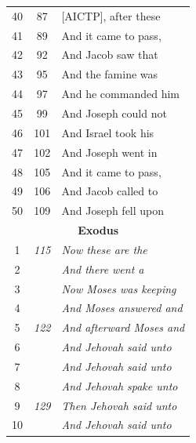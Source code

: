 \documentclass{article}
\newlength{\minipageheight}
\newlength{\minipagewidth}
\begin{document}
\begin{minipage}[l][\minipageheight][t]{\minipagewidth}
\begin{longtable}{ccl}
        40          & 87           & [AICTP], after these             \\
        41          & 89           & And it came to pass,             \\
        42          & 92           & And Jacob saw that               \\
        43          & 95           & And the famine was               \\
        44          & 97           & And he commanded him             \\
        45          & 99           & And Joseph could not             \\
        46          & 101          & And Israel took his              \\
        47          & 102          & And Joseph went in               \\
        48          & 105          & And it came to pass,             \\
        49          & 106          & And Jacob called to              \\
        50          & 109          & And Joseph fell upon             \\

        \multicolumn{3}{c}{\textbf{Exodus}}                           \\
        \hline
        1           & \textit{115} & \textit{Now these are the}       \\
        2           &              & \textit{And there went a}        \\
        3           &              & \textit{Now Moses was keeping}   \\
        4           &              & \textit{And Moses answered and}  \\
        5           & \textit{122} & \textit{And afterward Moses and} \\
        6           &              & \textit{And Jehovah said unto}   \\
        7           &              & \textit{And Jehovah said unto}   \\
        8           &              & \textit{And Jehovah spake unto}  \\
        9           & \textit{129} & \textit{Then Jehovah said unto}  \\
        10          &              & \textit{And Jehovah said unto}   \\
    \end{longtable}
\end{minipage}%
\end{document}
